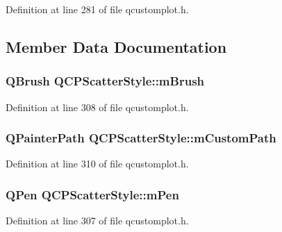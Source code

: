 Definition at line 281 of file qcustomplot.\-h.



\subsection{Member Data Documentation}
\hypertarget{class_q_c_p_scatter_style_a1b9c6ab10aebcaf236f1f45d1d6d64d1}{
\subsubsection[{m\-Brush}]{\setlength{\rightskip}{0pt plus 5cm}Q\-Brush Q\-C\-P\-Scatter\-Style\-::m\-Brush\hspace{0.3cm}{\ttfamily [protected]}}}\label{class_q_c_p_scatter_style_a1b9c6ab10aebcaf236f1f45d1d6d64d1}


Definition at line 308 of file qcustomplot.\-h.

\hypertarget{class_q_c_p_scatter_style_a813cb074744dc5a2f59cc99d6a10c6f0}{
\subsubsection[{m\-Custom\-Path}]{\setlength{\rightskip}{0pt plus 5cm}Q\-Painter\-Path Q\-C\-P\-Scatter\-Style\-::m\-Custom\-Path\hspace{0.3cm}{\ttfamily [protected]}}}\label{class_q_c_p_scatter_style_a813cb074744dc5a2f59cc99d6a10c6f0}


Definition at line 310 of file qcustomplot.\-h.

\hypertarget{class_q_c_p_scatter_style_a0f6a85e6d1e3ae1ca1b6efb4d4cdfe17}{
\subsubsection[{m\-Pen}]{\setlength{\rightskip}{0pt plus 5cm}Q\-Pen Q\-C\-P\-Scatter\-Style\-::m\-Pen\hspace{0.3cm}{\ttfamily [protected]}}}\label{class_q_c_p_scatter_style_a0f6a85e6d1e3ae1ca1b6efb4d4cdfe17}


Definition at line 307 of file qcustomplot.\-h.

